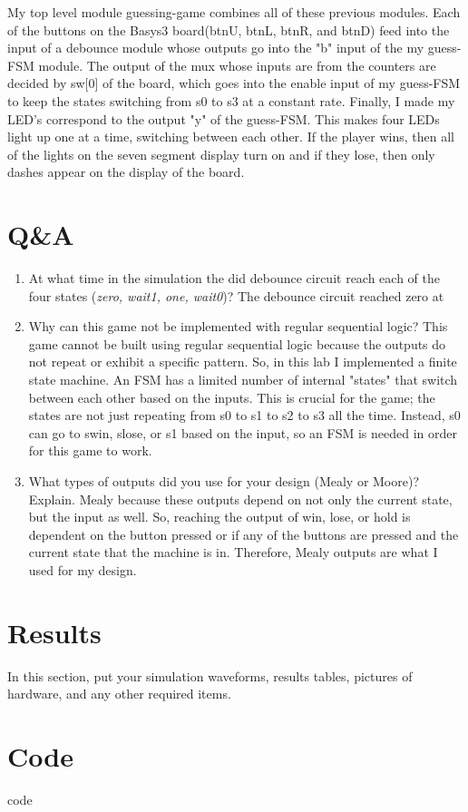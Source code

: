\documentclass[11pt]{article}
\begin{document}
My top level module guessing-game combines all of these previous modules. Each of the buttons on the Basys3 board(btnU, btnL, btnR, and btnD) feed into the input of a debounce module whose outputs go into the "b" input of the my guess-FSM module. The output of the mux whose inputs are from the counters are decided by sw[0] of the board, which goes into the enable input of my guess-FSM to keep the states switching from s0 to s3 at a constant rate. Finally, I made my LED's correspond to the output "y" of the guess-FSM. This makes four LEDs light up one at a time, switching between each other. If the player wins, then all of the lights on the seven segment display turn on and if they lose, then only dashes appear on the display of the board.


\section*{Q\&A}

\begin{enumerate}
	\item At what time in the simulation the did debounce circuit reach each of the four states (\verb||\textit{zero, wait1, one, wait0})?
		The debounce circuit reached zero at 

	\item Why can this game not be implemented with regular sequential logic?
		This game cannot be built using regular sequential logic because the outputs do not repeat or exhibit a specific pattern. So, in this lab I implemented a finite state machine. An FSM has a limited number of internal "states" that switch between each other based on the inputs. This is crucial for the game; the states are not just repeating from s0 to s1 to s2 to s3 all the time. Instead, s0 can go to swin, slose, or s1 based on the input, so an FSM is needed in order for this game to work.

	\item What types of outputs did you use for your design (Mealy or Moore)? Explain.
		Mealy because these outputs depend on not only the current state, but the input as well. So, reaching the output of win, lose, or hold is dependent on the button pressed or if any of the buttons are pressed and the current state that the machine is in. Therefore, Mealy outputs are what I used for my design.

\end{enumerate}


\section*{Results}

In this section, put your simulation waveforms, results tables, pictures of hardware, and any other required items.


\section*{Code}

code
\end{document}

